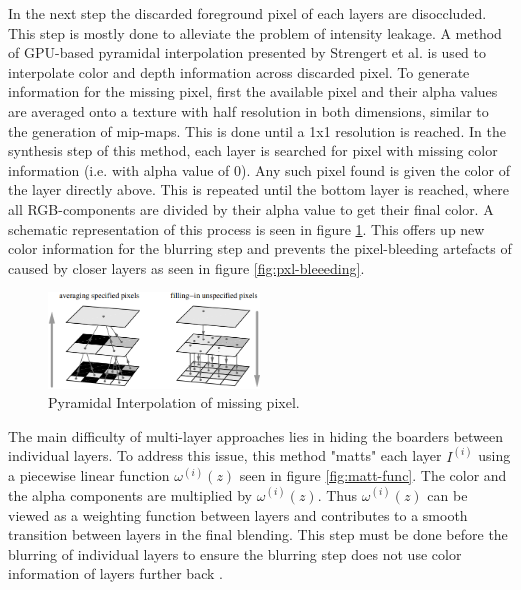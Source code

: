 In the next step the discarded foreground pixel of each layers are disoccluded.
This step is mostly done to alleviate the problem of intensity leakage.
A method of GPU-based pyramidal interpolation presented by Strengert et al. \cite{Strengert.2006} is used to interpolate color and depth information across discarded pixel.
To generate information for the missing pixel, first the available pixel and their alpha values are averaged onto a texture with half resolution in both dimensions, similar to the generation of mip-maps.
This is done until a 1x1 resolution is reached.
In the synthesis step of this method, each layer is searched for pixel with missing color information (i.e. with alpha value of 0).
Any such pixel found is given the color of the layer directly above.
This is repeated until the bottom layer is reached, where all RGB-components are divided by their alpha value to get their final color.
A schematic representation of this process is seen in figure \ref{fig:pyramidal-interpolation}.
This offers up new color information for the blurring step and prevents the pixel-bleeding artefacts of caused by closer layers as seen in figure \ref{fig:pxl-bleeeding}.

\begin{figure}[h]
    \centering
    \includegraphics[width=0.5\textwidth]{images/pyramidal-interpolation.png}
    \caption{Pyramidal Interpolation of missing pixel.\cite{Kraus.2007}}
    \label{fig:pyramidal-interpolation}
\end{figure}

The main difficulty of multi-layer approaches lies in hiding the boarders between individual layers.
To address this issue, this method "matts" each layer $I^{(i)}$ using a piecewise linear function $\omega^{(i)}(z)$ seen in figure \ref{fig:matt-func}.
The color and the alpha components are multiplied by $\omega^{(i)}(z)$.
Thus $\omega^{(i)}(z)$ can be viewed as a weighting function between layers and contributes to a smooth transition between layers in the final blending.
This step must be done before the blurring of individual layers to ensure the blurring step does not use color information of layers further back \cite{Kraus.2007}.

